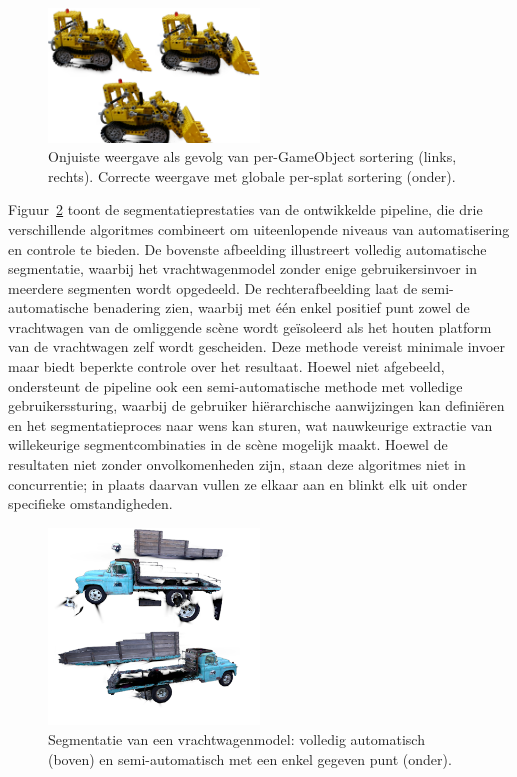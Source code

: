 \documentclass[twocolumn]{article}
\begin{document}
	\begin{figure}[h!]
		\centering
		\includegraphics[width=0.5\textwidth]{Images/Untitled.png}
		\caption{Onjuiste weergave als gevolg van per-GameObject sortering (links, rechts). Correcte weergave met globale per-splat sortering (onder).}
		\label{fig:render}
	\end{figure}
	\FloatBarrier
	\noindent
Figuur~\ref{fig:trucks} toont de segmentatieprestaties van de ontwikkelde pipeline, die drie verschillende algoritmes combineert om uiteenlopende niveaus van automatisering en controle te bieden. De bovenste afbeelding illustreert volledig automatische segmentatie, waarbij het vrachtwagenmodel zonder enige gebruikersinvoer in meerdere segmenten wordt opgedeeld. De rechterafbeelding laat de semi-automatische benadering zien, waarbij met één enkel positief punt zowel de vrachtwagen van de omliggende scène wordt geïsoleerd als het houten platform van de vrachtwagen zelf wordt gescheiden. Deze methode vereist minimale invoer maar biedt beperkte controle over het resultaat. Hoewel niet afgebeeld, ondersteunt de pipeline ook een semi-automatische methode met volledige gebruikerssturing, waarbij de gebruiker hiërarchische aanwijzingen kan definiëren en het segmentatieproces naar wens kan sturen, wat nauwkeurige extractie van willekeurige segmentcombinaties in de scène mogelijk maakt. Hoewel de resultaten niet zonder onvolkomenheden zijn, staan deze algoritmes niet in concurrentie; in plaats daarvan vullen ze elkaar aan en blinkt elk uit onder specifieke omstandigheden.
	\begin{figure}[h!]
		\centering
		\includegraphics[width=0.5\textwidth]{Images/trucks.png}
		\caption{Segmentatie van een vrachtwagenmodel: volledig automatisch (boven) en semi-automatisch met een enkel gegeven punt (onder).
		}
		\label{fig:trucks}
	\end{figure}
	\FloatBarrier
	\noindent
\end{document}
